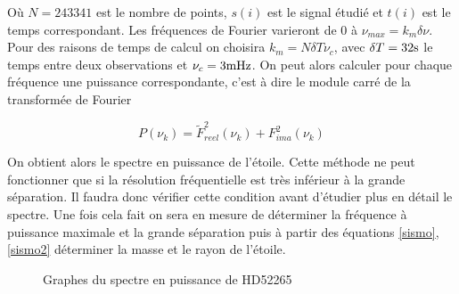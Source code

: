 \documentclass[a4paper,11pt]{article}
\numberwithin{equation}{section}
\begin{document}
Où $N = 243341$ est le nombre de points, $s(i)$ est le signal étudié et $t(i)$ est le temps correspondant. Les fréquences de Fourier varieront de 0 à $\nu_{max} = k_{m} 
\delta\nu$. Pour des raisons de temps de calcul on choisira $k_m = N\delta T \nu_c$, avec $\delta T = 32\rm s$ le temps entre deux observations et $\nu_c = 3\rm mHz$. On peut alors calculer pour chaque fréquence une puissance correspondante, c'est à dire le module carré de la transformée de Fourier

\begin{equation}
  P(\nu_k) = \tilde F_{reel}^2 (\nu_k) + F_{ima}^2(\nu_k)
\end{equation}

On obtient alors le spectre en puissance de l'étoile. Cette méthode ne peut fonctionner que si la résolution fréquentielle est très inférieur à la grande séparation. Il faudra donc vérifier cette condition avant d'étudier plus en détail le spectre. Une fois cela fait on sera en mesure de déterminer la fréquence à puissance maximale et la grande séparation puis à partir des équations \ref{sismo}, \ref{sismo2} déterminer la masse et le rayon de l'étoile.

\begin{figure}[H]
  \centering
  \caption{Graphes du spectre en puissance de HD52265}
\end{figure}
\end{document}
